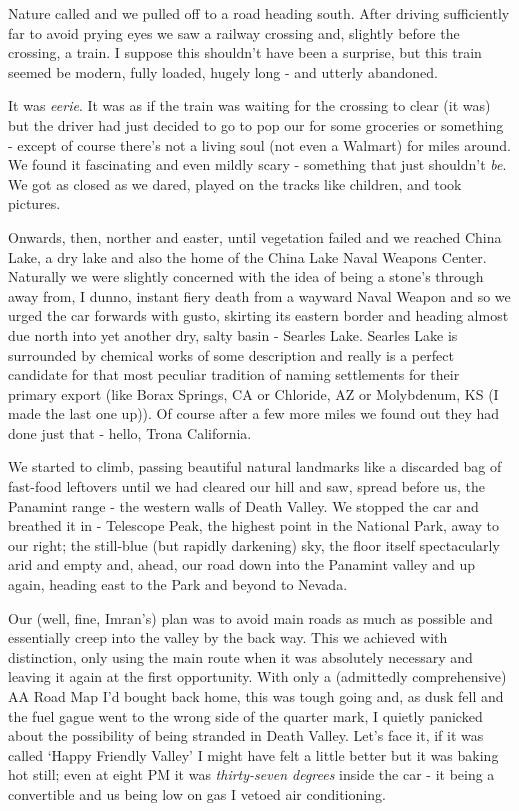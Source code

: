 \documentclass[a5paper,titlepage,draft]{book}
\begin{document}
Nature called and we pulled off to a road heading south.  After driving sufficiently far to avoid prying eyes we saw a railway crossing and, slightly before the crossing, a train. I suppose this shouldn't have been a surprise, but this train seemed be modern, fully loaded, hugely long - and utterly abandoned.

It was \emph{eerie}.  It was as if the train was waiting for the crossing to clear (it was) but the driver had just decided to go to pop our for some groceries or something - except of course there's not a living soul (not even a Walmart) for miles around.  We found it fascinating and even mildly scary - something that just shouldn't \emph{be}.  We got as closed as we dared, played on the tracks like children, and took pictures.

Onwards, then, norther and easter, until vegetation failed and we reached China Lake, a dry lake and also the home of the China Lake Naval Weapons Center.  Naturally we were slightly concerned with the idea of being a stone's through away from, I dunno, instant fiery death from a wayward Naval Weapon and so we urged the car forwards with gusto, skirting its eastern border and heading almost due north into yet another dry, salty basin - Searles Lake.  Searles Lake is surrounded by chemical works of some description and really is a perfect candidate for that most peculiar tradition of naming settlements for their primary export (like Borax Springs, CA or Chloride, AZ or Molybdenum, KS (I made the last one up)).  Of course after a few more miles we found out they had done just that - hello, Trona California.

We started to climb, passing beautiful natural landmarks like a discarded bag of fast-food leftovers until we had cleared our hill and saw, spread before us, the Panamint range - the western walls of Death Valley.  We stopped the car and breathed it in - Telescope Peak, the highest point in the National Park, away to our right; the still-blue (but rapidly darkening) sky, the floor itself spectacularly arid and empty and, ahead, our road down into the Panamint valley and up again, heading east to the Park and beyond to Nevada.

Our (well, fine, Imran's) plan was to avoid main roads as much as possible and essentially creep into the valley by the back way.  This we achieved with distinction, only using the main route when it was absolutely necessary and leaving it again at the first opportunity.  With only a (admittedly comprehensive) AA Road Map I'd bought back home, this was tough going and, as dusk fell and the fuel gague went to the wrong side of the quarter mark, I quietly panicked about the possibility of being stranded in Death Valley.  Let's face it, if it was called `Happy Friendly Valley' I might have felt a little better but it was baking hot still; even at eight PM it was \emph{thirty-seven degrees} inside the car - it being a convertible and us being low on gas I vetoed air conditioning.
\end{document}

